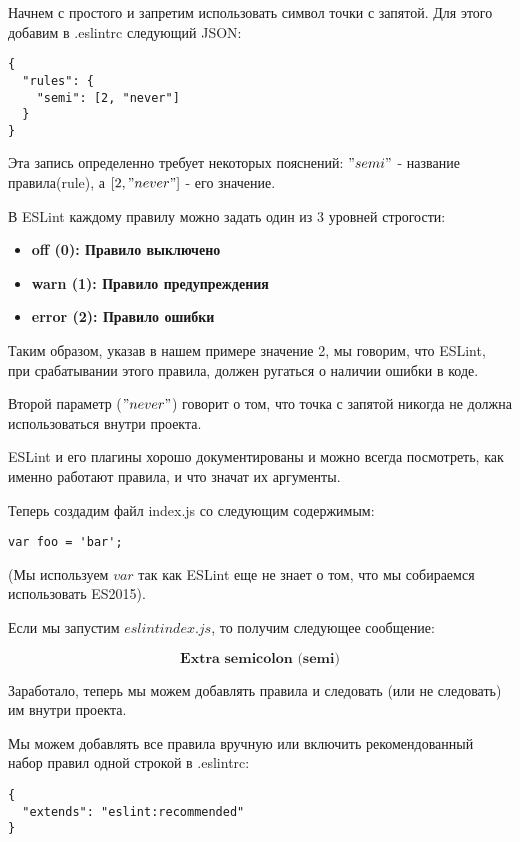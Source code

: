 Начнем с простого и запретим использовать символ точки с запятой. Для этого добавим в .eslintrc следующий JSON:

\begin{lstlisting}
{
  "rules": {
    "semi": [2, "never"]
  } 
}
\end{lstlisting}

Эта запись определенно требует некоторых пояснений: $"semi"$ - название правила(rule), а $[2, "never"]$ - его значение. 

В ESLint каждому правилу можно задать один из 3 уровней строгости:

\begin{itemize}
  \item \textbf{off (0): Правило выключено}
  \item \textbf{warn (1): Правило предупреждения}
  \item \textbf{error (2): Правило ошибки}
\end{itemize}

Таким образом, указав в нашем примере значение 2, мы говорим, что ESLint, при срабатывании этого правила, должен ругаться о наличии ошибки в коде.

Второй параметр ($"never"$) говорит о том, что точка с запятой никогда не должна использоваться внутри проекта.

ESLint и его плагины хорошо документированы и можно всегда посмотреть, как именно работают правила, и что значат их аргументы.

Теперь создадим файл index.js со следующим содержимым:

\begin{lstlisting}
var foo = 'bar';
\end{lstlisting}

(Мы используем $var$ так как ESLint еще не знает о том, что мы собираемся использовать ES2015).

Если мы запустим $eslint index.js$, то получим следующее сообщение:

$$\textbf{Extra semicolon (semi)}$$

Заработало, теперь мы можем добавлять правила и следовать (или не следовать) им внутри проекта.

Мы можем добавлять все правила вручную или включить рекомендованный набор правил одной строкой в .eslintrc:

\begin{lstlisting}
{
  "extends": "eslint:recommended"
}
\end{lstlisting}

